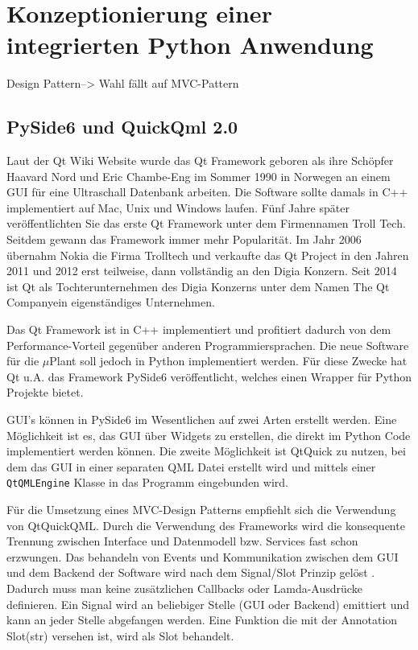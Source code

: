 

\chapter{Konzeptionierung einer integrierten Python Anwendung}\label{PythonApp}

Design Pattern--> Wahl fällt auf MVC-Pattern

\section{PySide6 und QuickQml 2.0}

Laut der Qt Wiki Website \cite{QtWikiHistory} wurde das Qt Framework geboren als ihre Schöpfer Haavard Nord und
Eric Chambe-Eng im Sommer 1990 in Norwegen an einem GUI für eine Ultraschall Datenbank arbeiten.
Die Software sollte damals in C++ implementiert auf Mac, Unix und Windows laufen.
Fünf Jahre später veröffentlichten Sie das erste Qt Framework unter dem Firmennamen Troll Tech.
Seitdem gewann das Framework immer mehr Popularität.
Im Jahr 2006 übernahm Nokia die Firma Trolltech und verkaufte das Qt Project in den Jahren 2011 und 2012 erst teilweise,
dann vollständig an den Digia Konzern.
Seit 2014 ist Qt als Tochterunternehmen des Digia Konzerns unter dem Namen \glqq The Qt Company\grqq ein eigenständiges Unternehmen.

Das Qt Framework ist in C++ implementiert und profitiert dadurch von dem Performance-Vorteil gegenüber anderen
Programmiersprachen.
Die neue Software für die $\mu$Plant soll jedoch in Python implementiert werden.
Für diese Zwecke hat Qt u.A. das Framework PySide6 veröffentlicht, welches einen Wrapper für Python Projekte bietet.

GUI's können in PySide6 im Wesentlichen auf zwei Arten erstellt werden.
Eine Möglichkeit ist es, das GUI über Widgets\cite{pysideQtWidgets} zu erstellen, die direkt im Python Code implementiert werden können.
Die zweite Möglichkeit ist QtQuick \cite{pysideQtQuick} zu nutzen, bei dem das GUI in einer separaten QML Datei erstellt wird und
mittels einer \verb|QtQMLEngine| Klasse in das Programm eingebunden wird.

Für die Umsetzung eines MVC-Design Patterns empfiehlt sich die Verwendung von QtQuickQML.
Durch die Verwendung des Frameworks wird die konsequente Trennung zwischen Interface und Datenmodell bzw. Services fast
schon erzwungen.
Das behandeln von Events und Kommunikation zwischen dem GUI und dem Backend der Software wird nach dem Signal/Slot Prinzip
gelöst \cite{pysideSignalSlot}.
Dadurch muss man keine zusätzlichen Callbacks oder Lamda-Ausdrücke definieren.
Ein Signal wird an beliebiger Stelle (GUI oder Backend) emittiert und kann an jeder Stelle abgefangen werden.
Eine Funktion die mit der Annotation \glqq Slot(str) \grqq versehen ist, wird als Slot behandelt.
